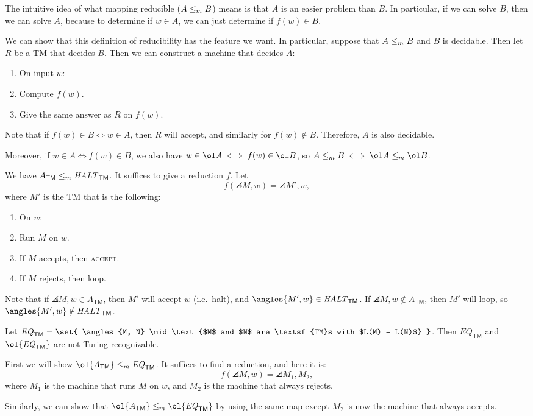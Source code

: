 \documentclass{standalone}
\begin{document}
The intuitive idea of what mapping reducible (\(A \mathrel{\leq_m} B\)) means is
that \(A\) is an easier problem than \(B\).
In particular, if we can solve \(B\), then we can solve \(A\),
because to determine if \(w \in A\), we can just determine if \(f(w) \in B\).

We can show that this definition of reducibility has the feature we want.
In particular, suppose that \(A \mathrel{\leq_m} B\) and \(B\) is decidable.
Then let \(R\) be a \textsf{TM} that decides \(B\).
Then we can construct a machine that decides \(A\):
\begin{enumerate}[start=0]
  \item On input \(w\):
  \item Compute \(f(w)\).
  \item Give the same answer as \(R\) on \(f(w)\).
\end{enumerate}
Note that if \(f(w) \in B \iff w \in A\), then \(R\) will accept,
and similarly for \(f(w) \notin B\).
Therefore, \(A\) is also decidable.

Moreover, if \(w \in A \iff f(w) \in B\),
we also have \(w \in \ol A \iff f(w) \in \ol B\),
so \(A \mapredu B \iff \ol A \mapredu \ol B\).


\begin{example}
  We have \(A_{\textsf{TM}} \mathrel{\leq_m} \mathit{HALT}_{\textsf{TM}}\).
  \tcblower
  It suffices to give a reduction \(f\). Let
  \[
    f(\angles{M, w}) = \angles{M', w},
  \]
  where \(M'\) is the \textsf{TM} that is the following:
  \begin{enumerate}[start=0]
    \item On \(w\):
    \item Run \(M\) on \(w\).
    \item If \(M\) accepts, then \textsc{accept}.
    \item If \(M\) rejects, then loop.
  \end{enumerate}

  Note that if \(\angles{M, w} \in A_{\textsf{TM}}\),
  then \(M'\) will accept \(w\) (i.e.\ halt),
  and \(\angles{M', w} \in \HALT_{\textsf{TM}}\).
  If \(\angles{M, w} \notin A_{\textsf{TM}}\),
  then \(M'\) will loop, so \(\angles{M', w} \notin \HALT_{\textsf{TM}}\).
\end{example}

\begin{example}
  Let \(\mathit{EQ}_{\textsf{TM}} = \set{
    \angles{M, N} \mid \text{$M$ and $N$ are \textsf{TM}s with $L(M) = L(N)$}
  }\).
  Then \(\mathit{EQ}_{\textsf{TM}}\) and \(\ol{\mathit{EQ}_{\textsf{TM}}}\)
  are not Turing recognizable.
  \tcblower
  
  First we will show
  \(\ol{A_{\textsf{TM}}} \mapredu \mathit{EQ}_{\textsf{TM}}\).
  It suffices to find a reduction, and here it is:
  \[
    f(\angles{M, w}) = \angles{M_1, M_2},
  \]
  where \(M_1\) is the machine that runs \(M\) on \(w\),
  and \(M_2\) is the machine that always rejects.

  Similarly, we can show that
  \(\ol{A_{\textsf{TM}}} \mapredu \ol{\mathit{EQ}_{\textsf{TM}}}\)
  by using the same map except \(M_2\) is now the machine that always accepts.
\end{example}
\end{document}
